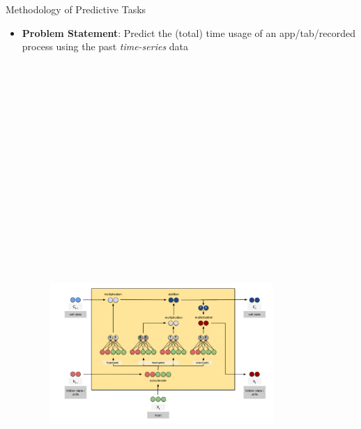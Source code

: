 \documentclass[final]{beamer}
\newlength{\colwidth}
\begin{document}
\begin{frame}[t]
\begin{columns}[t]
\begin{column}{\colwidth}
\begin{exampleblock}{\huge{Methodology of Predictive Tasks}}
{\begin{itemize}
          \end{itemize}


          \begin{itemize}
            \item \textbf{Problem Statement}: Predict the (total) time usage of an app/tab/recorded process using the past \textit{time-series} data
                  \begin{figure}\hspace*{-0.8cm}\includegraphics[width=0.8\textwidth, height=22cm]{lstm-lt.jpeg}\end{figure}


\end{itemize}}
\end{exampleblock}
\end{column}
\end{columns}
\end{frame}
\end{document}
